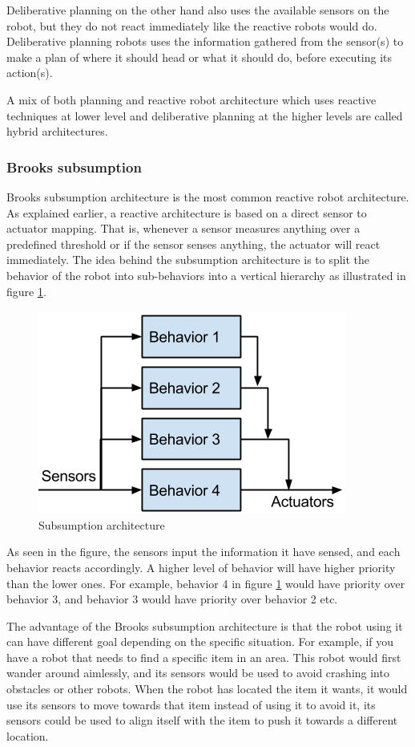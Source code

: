 Deliberative planning on the other hand also uses the available sensors on the robot, but they do not react immediately like the reactive robots would do. Deliberative planning robots uses the information gathered from the sensor(s) to make a plan of where it should head or what it should do, before executing its action(s).

A mix of both planning and reactive robot architecture which uses reactive techniques at lower level and deliberative planning at the higher levels are called hybrid architectures.

\subsubsection{Brooks subsumption}
\label{sec:brooks}
Brooks subsumption architecture is the most common reactive robot architecture. As explained earlier, a reactive architecture is based on a direct sensor to actuator mapping. That is, whenever a sensor measures anything over a predefined threshold or if the sensor senses anything, the actuator will react immediately. The idea behind the subsumption architecture is to split the behavior of the robot into sub-behaviors into a vertical hierarchy as illustrated in figure \ref{fig:subsumption}. 
\begin{figure}[H]
    \centering
    \includegraphics[width=0.5\linewidth]{figs/subsumption}
    \caption[Subsumption architecture]{Subsumption architecture}\label{fig:subsumption}
\end{figure}

As seen in the figure, the sensors input the information it have sensed, and each behavior reacts accordingly. A higher level of behavior will have higher priority than the lower ones. For example, behavior 4 in figure \ref{fig:subsumption} would have priority over behavior 3, and behavior 3 would have priority over behavior 2 etc.


The advantage of the Brooks subsumption architecture is that the robot using it can have different goal depending on the specific situation. For example, if you have a robot that needs to find a specific item in an area. This robot would first wander around aimlessly, and its sensors would be used to avoid crashing into obstacles or other robots. When the robot has located the item it wants, it would use its sensors to move towards that item instead of using it to avoid it, its sensors could be used to align itself with the item to push it towards a different location.

